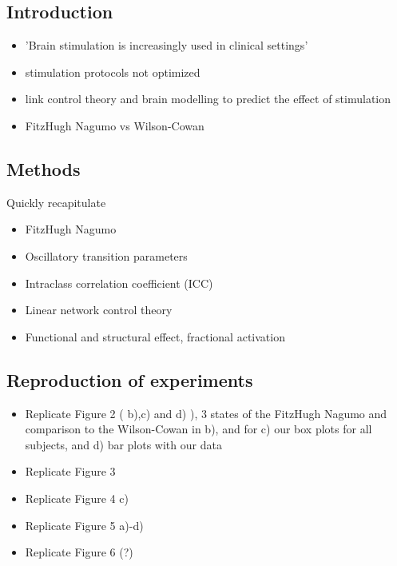 

\subsection{Introduction}
\begin{itemize}
 \item 
  'Brain stimulation is increasingly used in clinical settings'
 \item
  stimulation protocols not optimized
 \item
  link control theory and brain modelling to predict the effect of stimulation 
 \item
  FitzHugh Nagumo vs Wilson-Cowan
\end{itemize}

\subsection{Methods}

Quickly recapitulate 
\begin{itemize}
 \item 
  FitzHugh Nagumo
 \item
  Oscillatory transition parameters
 \item
  Intraclass correlation coefficient (ICC)
 \item
  Linear network control theory
 \item
  Functional and structural effect, fractional activation
\end{itemize}

\subsection{Reproduction of experiments}

\begin{itemize}
 \item 
  Replicate Figure 2 ( b),c) and d) ), 3 states of the FitzHugh Nagumo and comparison to the Wilson-Cowan in b),
  and for c) our box plots for all subjects, and d) bar plots with our data
  
 \item
  Replicate Figure 3 

 \item
  Replicate Figure 4 c) 
  
 \item
  Replicate Figure 5 a)-d)
  
 \item
  Replicate Figure 6 (?)
\end{itemize}

